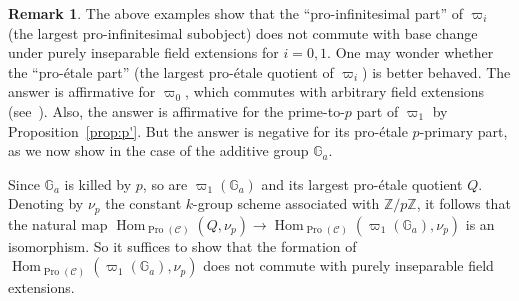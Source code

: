 \documentclass[11pt]{article}
\theoremstyle{definition}
\newtheorem{rema}[theo]{Remark}
\numberwithin{equation}{section}
\newcommand\bG{{\mathbb G}}
\newcommand\bZ{{\mathbb Z}}
\newcommand\cC{{\mathcal C}}
\DeclareMathOperator{\Hom}{Hom}
\DeclareMathOperator{\Pro}{Pro}
\theoremstyle{remark}
\begin{document}
\begin{rema}\label{3.19.3}
The above examples show that the ``pro-infinitesimal part'' of $\varpi_i$ (the largest pro-infinitesimal subobject) does not commute with base change under purely inseparable field extensions for $i = 0, 1$. One may wonder whether the ``pro-\'etale part'' (the largest pro-\'etale quotient of $\varpi_i$) is better behaved. The answer is affirmative for $\varpi_0$, which commutes with arbitrary field extensions (see~\cite[II.5.1]{DG}). Also, the answer is affirmative for the prime-to-$p$ part of $\varpi_1$ by Proposition~\ref{prop:p'}. But the answer is negative for its pro-\'etale $p$-primary part, as we now show in the case of the additive group $\bG_a$.

Since $\bG_a$ is killed by $p$, so are $\varpi_1(\bG_a)$ and its largest pro-\'etale quotient $Q$. Denoting by $\nu_p$ the constant $k$-group scheme associated with $\bZ/p \bZ$, it follows that the natural map $\Hom_{\Pro(\cC)}(Q,\nu_p) \to
\Hom_{\Pro(\cC)}(\varpi_1(\bG_a), \nu_p)$ is an isomorphism. So it suffices to show that the formation of $\Hom_{\Pro(\cC)}(\varpi_1(\bG_a), \nu_p)$ does not commute with purely inseparable field extensions.


\end{rema}
\end{document}
